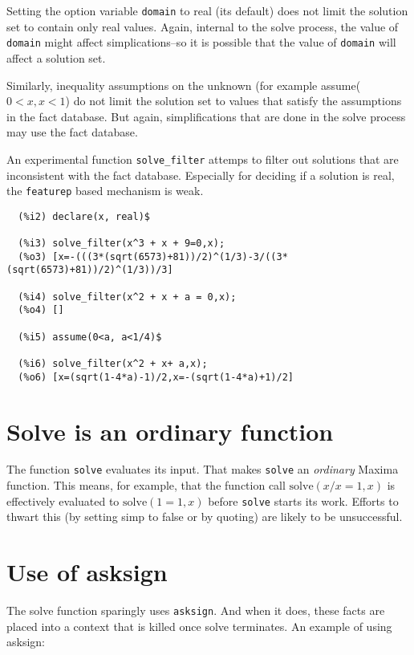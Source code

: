 \documentclass[]{scrartcl}
\newcommand{\solve}{\texttt{solve}}
\begin{document}
Setting the option variable \texttt{domain} to real (its default) does not limit the solution set
to contain only real values. Again, internal to the solve process, the value of \texttt{domain}
might affect simplications--so it is possible that the value of \texttt{domain} will affect a
solution set.

Similarly, inequality assumptions on the unknown (for example assume( \(0 < x, x < 1\)) do not
limit the solution set to values that satisfy the assumptions in the fact database. But again,
simplifications that are done in the solve process may use the fact database.

An experimental function \texttt{solve\_filter} attemps to filter out solutions that are
inconsistent with the fact database. Especially for deciding if a solution is real,
the \texttt{featurep} based mechanism is weak.

\begin{verbatim}
  (%i2)	declare(x, real)$

  (%i3)	solve_filter(x^3 + x + 9=0,x);
  (%o3)	[x=-(((3*(sqrt(6573)+81))/2)^(1/3)-3/((3*(sqrt(6573)+81))/2)^(1/3))/3]

  (%i4)	solve_filter(x^2 + x + a = 0,x);
  (%o4)	[]

  (%i5)	assume(0<a, a<1/4)$

  (%i6)	solve_filter(x^2 + x+ a,x);
  (%o6)	[x=(sqrt(1-4*a)-1)/2,x=-(sqrt(1-4*a)+1)/2]
\end{verbatim}

\section{Solve is an ordinary function}

The function \solve \/ evaluates its input. That makes \solve \/ an \emph{ordinary} Maxima function.
This means, for example, that the function call \(\mathrm{solve}(x/x=1,x)\) is effectively evaluated to
\(\mathrm{solve}(1=1,x)\) before \solve \/ starts its work. Efforts to thwart this
(by setting simp to false or by quoting) are likely to be unsuccessful.


\section{Use of asksign}

The solve function sparingly uses \texttt{asksign}. And when it does, these facts are placed
into a context that is killed once solve terminates. An example of using asksign:
\end{document}

